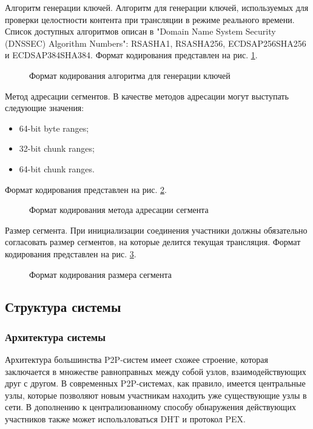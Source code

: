		Алгоритм генерации ключей. Алгоритм для генерации ключей, используемых для проверки целостности
		контента при трансляции в режиме реального времени. Список доступных алгоритмов описан в
		"Domain Name System Security (DNSSEC) Algorithm Numbers": RSASHA1, RSASHA256, ECDSAP256SHA256 и
		ECDSAP384SHA384. Формат кодирования представлен на рис. \ref{img:ppspp-lsa-option}.

		\begin{figure}[h]
			\caption{Формат кодирования алгоритма для генерации ключей}
			\label{img:ppspp-lsa-option}
		\end{figure}

		Метод адресации сегментов. В качестве методов адресации могут выступать следующие значения:
		\begin{itemize}
			\item 64-bit byte ranges;
			\item 32-bit chunk ranges;
			\item 64-bit chunk ranges.
		\end{itemize}
		Формат кодирования представлен на рис. \ref{img:ppspp-cam-option}.

		\begin{figure}[h]
			\caption{Формат кодирования метода адресации сегмента}
			\label{img:ppspp-cam-option}
		\end{figure}

		Размер сегмента. При инициализации соединения участники должны обязательно согласовать размер сегментов,
		на которые делится текущая трансляция. Формат кодирования представлен на рис. \ref{img:ppspp-chunk-size-option}.

		\begin{figure}[h]
			\caption{Формат кодирования размера сегмента}
			\label{img:ppspp-chunk-size-option}
		\end{figure}

	\subsection{Структура системы}
		\subsubsection{Архитектура системы}
			Архитектура большинства P2P-систем имеет схожее строение, которая заключается в множестве равноправных между
			собой узлов, взаимодействующих друг с другом. В современных P2P-системах, как правило, имеется центральные
			узлы, которые позволяют новым участникам находить уже существующие узлы в сети. В дополнению к
			централизованному способу обнаружения действующих участников также может использловаться DHT и протокол PEX.

